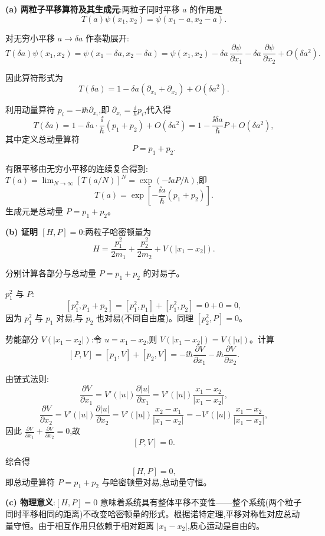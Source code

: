 \begin{solution}
	\textbf{(a) 两粒子平移算符及其生成元}:两粒子同时平移 $a$ 的作用是
	\[
	T(a)\psi(x_1,x_2)=\psi(x_1-a,x_2-a).
	\]

	对无穷小平移 $a\to\delta a$ 作泰勒展开:
	\[
	T(\delta a)\psi(x_1,x_2)=\psi(x_1-\delta a,x_2-\delta a)
	=\psi(x_1,x_2)-\delta a\,\frac{\partial\psi}{\partial x_1}-\delta a\,\frac{\partial\psi}{\partial x_2}+O(\delta a^2).
	\]

	因此算符形式为
	\[
	T(\delta a)=1-\delta a(\partial_{x_1}+\partial_{x_2})+O(\delta a^2).
	\]

	利用动量算符 $p_i=-\ii\hbar\partial_{x_i}$,即 $\partial_{x_i}=\frac{\ii}{\hbar}p_i$,代入得
	\[
	T(\delta a)=1-\delta a\cdot\frac{\ii}{\hbar}(p_1+p_2)+O(\delta a^2)
	=1-\frac{\ii\delta a}{\hbar}P+O(\delta a^2),
	\]
	其中定义总动量算符
	\[
	P=p_1+p_2.
	\]

	有限平移由无穷小平移的连续复合得到:$T(a)=\lim_{N\to\infty}[T(a/N)]^N=\exp(-\ii a P/\hbar)$,即
	\[
	\boxed{T(a)=\exp\!\left[-\frac{\ii a}{\hbar}(p_1+p_2)\right]}.
	\]
	生成元是总动量 $P=p_1+p_2$。

	\textbf{(b) 证明 $[H,P]=0$}:两粒子哈密顿量为
	\[
	H=\frac{p_1^2}{2m_1}+\frac{p_2^2}{2m_2}+V(|x_1-x_2|).
	\]

	分别计算各部分与总动量 $P=p_1+p_2$ 的对易子。

	$p_1^2$ 与 $P$:
	\[
	[p_1^2,p_1+p_2]=[p_1^2,p_1]+[p_1^2,p_2]=0+0=0,
	\]
	因为 $p_1^2$ 与 $p_1$ 对易,与 $p_2$ 也对易(不同自由度)。同理 $[p_2^2,P]=0$。

	势能部分 $V(|x_1-x_2|)$:令 $u=x_1-x_2$,则 $V(|x_1-x_2|)=V(|u|)$。计算
	\[
	[P,V]=[p_1,V]+[p_2,V]=-\ii\hbar\frac{\partial V}{\partial x_1}-\ii\hbar\frac{\partial V}{\partial x_2}.
	\]

	由链式法则:
	\[
	\frac{\partial V}{\partial x_1}=V'(|u|)\frac{\partial |u|}{\partial x_1}=V'(|u|)\frac{x_1-x_2}{|x_1-x_2|},
	\]
	\[
	\frac{\partial V}{\partial x_2}=V'(|u|)\frac{\partial |u|}{\partial x_2}=V'(|u|)\frac{x_2-x_1}{|x_1-x_2|}=-V'(|u|)\frac{x_1-x_2}{|x_1-x_2|},
	\]
	因此 $\frac{\partial V}{\partial x_1}+\frac{\partial V}{\partial x_2}=0$,故
	\[
	[P,V]=0.
	\]

	综合得
	\[
	[H,P]=0,
	\]
	即总动量算符 $P=p_1+p_2$ 与哈密顿量对易,总动量守恒。

	\textbf{(c) 物理意义}:$[H,P]=0$ 意味着系统具有整体平移不变性——整个系统(两个粒子同时平移相同的距离)不改变哈密顿量的形式。根据诺特定理,平移对称性对应总动量守恒。由于相互作用只依赖于相对距离 $|x_1-x_2|$,质心运动是自由的。
	\end{solution}

